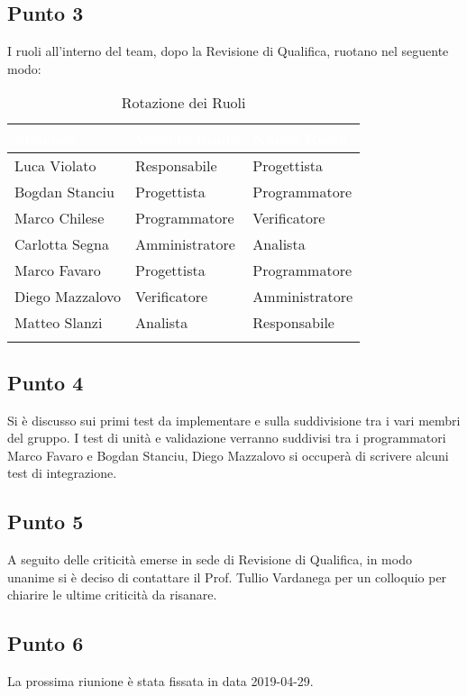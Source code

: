 \subsection{Punto 3}
I ruoli all'interno del team, dopo la Revisione di Qualifica, ruotano nel seguente modo:\\

\begin{center}
	\begin{longtable}[c]{|m{}|m{}|m{}|} 
		\hline
		\rowcolor{bluelogo}\textbf{\textcolor{white}{Membro}} & \textbf{\textcolor{white}{Vecchio Ruolo}} & \textbf{\textcolor{white}{Nuovo Ruolo}}\\
		\hline
		\hline
		Luca Violato & Responsabile & Progettista \\
		\hline
		\rowcolor{grigio}Bogdan Stanciu & Progettista & Programmatore \\
		\hline
		Marco Chilese & Programmatore & Verificatore\\
		\hline
		\rowcolor{grigio}Carlotta Segna & Amministratore & Analista\\
		\hline
		Marco Favaro & Progettista & Programmatore \\
		\hline
		\rowcolor{grigio} Diego Mazzalovo & Verificatore & Amministratore\\
		\hline
		Matteo Slanzi & Analista & Responsabile\\
		\hline
		\caption{Rotazione dei Ruoli}
	\end{longtable}

\end{center}

\subsection{Punto 4}
Si è discusso sui primi test da implementare e sulla suddivisione tra i vari membri del gruppo. 
I test di unità e validazione verranno suddivisi tra i programmatori Marco Favaro e Bogdan Stanciu, Diego Mazzalovo si occuperà di scrivere alcuni test di integrazione.
	
\subsection{Punto 5}
A seguito delle criticità emerse in sede di Revisione di Qualifica, in modo unanime si è deciso di contattare il Prof. Tullio Vardanega per un colloquio per chiarire le ultime criticità da risanare.

\subsection{Punto 6}
La prossima riunione è stata fissata in data 2019-04-29.